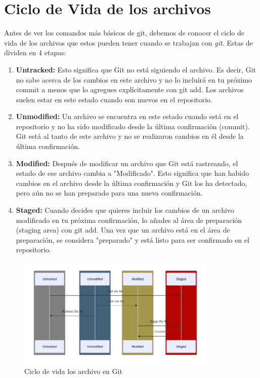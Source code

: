 \section{Ciclo de Vida de los archivos}

Antes de ver los comandos más básicos de git, debemos de conocer el ciclo de vida de los archivos que estos pueden tener cuando se trabajan con \emph{git}.
Estas de dividen en 4 etapas:
\begin{enumerate}
	\item \textbf{Untracked: } Esto significa que Git no está siguiendo el archivo. Es decir, Git no sabe acerca de los cambios en este archivo y no lo incluirá en tu próximo commit a menos que lo agregues explícitamente con git add. Los archivos suelen estar en este estado cuando son nuevos en el repositorio.
	\item \textbf{Unmodified: } Un archivo se encuentra en este estado cuando está en el repositorio y no ha sido modificado desde la última confirmación (commit). Git está al tanto de este archivo y no se realizaron cambios en él desde la última confirmación.
	\item \textbf{Modified: } Después de modificar un archivo que Git está rastreando, el estado de ese archivo cambia a "Modificado". Esto significa que han habido cambios en el archivo desde la última confirmación y Git los ha detectado, pero aún no se han preparado para una nueva confirmación.
	\item \textbf{Staged: } Cuando decides que quieres incluir los cambios de un archivo modificado en tu próxima confirmación, lo añades al área de preparación (staging area) con git add. Una vez que un archivo está en el área de preparación, se considera "preparado" y está listo para ser confirmado en el repositorio.
\end{enumerate}

\begin{figure}[h!]
		\centering
		\includegraphics[width=0.85\textwidth]{04FundamentosDeGit/Imagenes/cicloDeVida00.png}
		\caption{Ciclo de vida los archivo en Git}
		\label{fig:cicloDeVida}
\end{figure}

